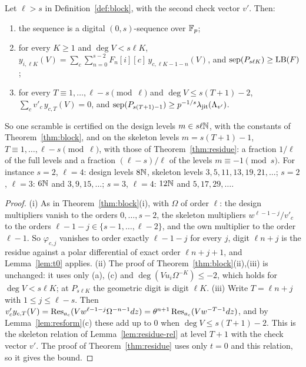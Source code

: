\begin{theorem}\label{thm:blocktwo}
Let $\ell>s$ in Definition~\ref{def:block}, with the second check vector $v'$. Then:
\begin{enumerate}
\item[(i)] the sequence is a digital $(0,s)$-sequence over $\mathbb{F}_p$;
\item[(ii)] for every $K\ge1$ and $\deg V<s\ell K$, $y_{i,\ell K}(V)=\sum_c\sum_{n=0}^{s-2}F_n[i][c]\,y_{c,\ell K-1-n}(V)$, and $\operatorname{sep}(P_{s\ell K})\ge\mathrm{LB}(F)$;
\item[(iii)] for every $T\equiv1,\dots,\ell-s\pmod\ell$ and $\deg V\le s(T+1)-2$, $\sum_cv'_c\,y_{c,T}(V)=0$, and $\operatorname{sep}(P_{s(T+1)-1})\ge p^{-1/s}\lambda_{\mathrm{jit}}(\Lambda_{v'})$.
\end{enumerate}
So one scramble is certified on the design levels $m\in s\ell\mathbb{N}$, with the constants of Theorem~\ref{thm:block}, and on the skeleton levels $m=s(T+1)-1$, $T\equiv1,\dots,\ell-s\pmod\ell$, with those of Theorem~\ref{thm:residue}: a fraction $1/\ell$ of the full levels and a fraction $(\ell-s)/\ell$ of the levels $m\equiv-1\pmod s$. For instance $s=2$, $\ell=4$: design levels $8\mathbb{N}$, skeleton levels $3,5,11,13,19,21,\dots$; $s=2$, $\ell=3$: $6\mathbb{N}$ and $3,9,15,\dots$; $s=3$, $\ell=4$: $12\mathbb{N}$ and $5,17,29,\dots$.
\end{theorem}

\begin{proof}
(i) As in Theorem~\ref{thm:block}(i), with $\Omega$ of order $\ell$: the design multipliers vanish to the orders $0,\dots,s-2$, the skeleton multipliers $w^{\ell-1-j}/v'_c$ to the orders $\ell-1-j\in\{s-1,\dots,\ell-2\}$, and the own multiplier to the order $\ell-1$. So $\varphi_{c,j}$ vanishes to order exactly $\ell-1-j$ for every $j$, digit $\ell n+j$ is the residue against a polar differential of exact order $\ell n+j+1$, and Lemma~\ref{lem:t0} applies.
(ii) The proof of Theorem~\ref{thm:block}(ii),(iii) is unchanged: it uses only (a), (c) and $\deg(Vu_i\Omega^{-K})\le-2$, which holds for $\deg V<s\ell K$; at $P_{s\ell K}$ the geometric digit is digit $\ell K$.
(iii) Write $T=\ell n+j$ with $1\le j\le\ell-s$. Then $v'_cy_{c,T}(V)=\operatorname{Res}_{a_c}(Vw^{\ell-1-j}\Omega^{-n-1}dz)=\theta^{n+1}\operatorname{Res}_{a_c}(Vw^{-T-1}dz)$, and by Lemma~\ref{lem:resform}(c) these add up to $0$ when $\deg V\le s(T+1)-2$. This is the skeleton relation of Lemma~\ref{lem:residue-rel} at level $T+1$ with the check vector $v'$. The proof of Theorem~\ref{thm:residue} uses only $t=0$ and this relation, so it gives the bound.
\end{proof}

